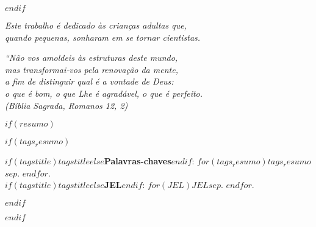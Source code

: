 \documentclass[$if(fontsize)$$fontsize$,$endif$$if(lang)$$lang$,$endif$$if(papersize)$$papersize$,$endif$$for(classoption)$$classoption$$sep$,$endfor$]{$documentclass$}	%
\begin{document}
$endif$


\newpage


\begin{dedicatoria}
	\vspace*{\fill}
	\centering
	\noindent
	\textit{ Este trabalho é dedicado às crianças adultas que,\\
		quando pequenas, sonharam em se tornar cientistas.} \vspace*{\fill}
\end{dedicatoria}

\begin{agradecimentos}


	
\end{agradecimentos}

\begin{epigrafe}
	\vspace*{\fill}
	\begin{flushright}
		\textit{``Não vos amoldeis às estruturas deste mundo, \\
			mas transformai-vos pela renovação da mente, \\
			a fim de distinguir qual é a vontade de Deus: \\
			o que é bom, o que Lhe é agradável, o que é perfeito.\\
			(Bíblia Sagrada, Romanos 12, 2)}
	\end{flushright}
\end{epigrafe}




$if(resumo)$
\setlength{\absparsep}{18pt} %
\begin{resumoumacoluna}
	
	
	$if(tags_resumo)$
	\vspace{\onelineskip}
	
	\noindent
	\textbf{$if(tagstitle)$$tagstitle$$else$Palavras-chaves$endif$}: $for(tags_resumo)$$tags_resumo$$sep$. $endfor$. \\	%
	\textbf{$if(tagstitle)$$tagstitle$$else$JEL$endif$}: $for(JEL)$$JEL$$sep$. $endfor$.	%
	
	
	$endif$
\end{resumoumacoluna}
$endif$
\end{document}
